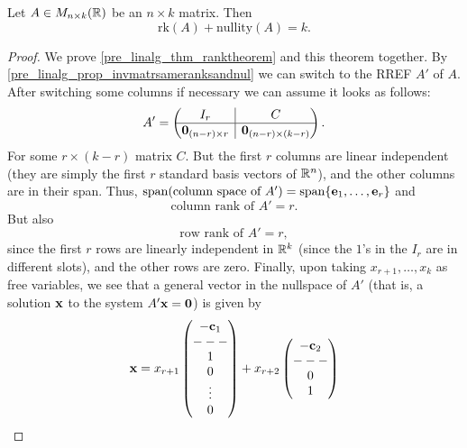 \documentclass[10pt, a4paper]{article}
\begin{document}
\begin{theorem}
    Let $A \in M_{n \times k}(\mathbb{R})$ be an $n \times k$ matrix.
    Then
    \[
    \mathrm{rk}(A) + \mathrm{nullity}(A) = k.
    \]
    \begin{proof}
        We prove \autoref{pre_linalg_thm_ranktheorem} and this theorem together.
        By \autoref{pre_linalg_prop_invmatrsameranksandnul} we can switch to the RREF $A'$ of $A$.
        After switching some columns if necessary we can assume it looks as follows:
        \[
        A' = \left(\hspace{-5pt}\begin{array}{c|c}
             I_r & C  \\
             \hline
             \mathbf{0}_{(n - r)\times r} & \mathbf{0}_{(n - r) \times (k - r)}
        \end{array}\hspace{-5pt}\right).
        \]
        For some $r \times (k - r)$ matrix $C$.
        But the first $r$ columns are linear independent
        (they are simply the first $r$ standard basis vectors of $\mathbb{R} ^ n$),
        and the other columns are in their span.
        Thus,
        $\mathrm{span}(\text{column space of } A') = \mathrm{span}\{\mathbf{e}_1, \dotsc, \mathbf{e}_r\}$ and
        \[
        \text{column rank of } A' = r.
        \]
        But also
        \[
        \text{row rank of } A' = r,
        \]
        since the first $r$ rows are linearly independent in $\mathbb{R} ^ k$
        (since the $1$'s in the $I_r$ are in different slots),
        and the other rows are zero.
        Finally,
        upon taking $x_{r + 1}, \dotsc, x_k$ as free variables,
        we see that a general vector in the nullspace of $A'$
        (that is,
        a solution $\mathbf{x}$ to the system $A'\mathbf{x} = \mathbf{0}$)
        is given by
        \[
        \mathbf{x} = x_{r + 1}\begin{pmatrix}
            -\mathbf{c}_1 \\
            - - - \\
            1 \\
            0 \\
            \vdots \\
            0
        \end{pmatrix}
        + x_{r + 2}\begin{pmatrix}
            -\mathbf{c}_2 \\
            - - - \\
            0 \\
            1 \\

\end{pmatrix}\]
\end{proof}
\end{theorem}
\end{document}
